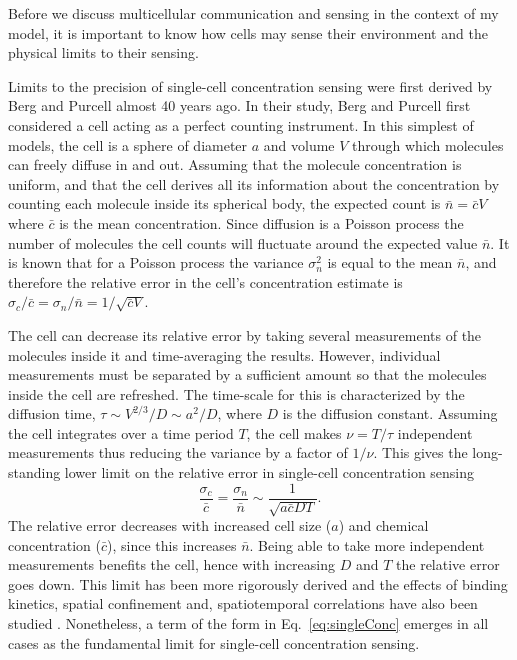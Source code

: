 \documentclass[a4paper]{article}
\begin{document}
Before we discuss multicellular communication and sensing in the context of my model, it is important to know how cells may sense their environment and the physical limits to their sensing.

Limits to the precision of single-cell concentration sensing were first derived by Berg and Purcell almost 40 years ago\cite{berg1977physics}. In their study, Berg and Purcell first considered a cell acting as a perfect counting instrument. In this simplest of models, the cell is a sphere of diameter $a$ and volume $V$ through which molecules can freely diffuse in and out. Assuming that the molecule concentration is uniform, and that the cell derives all its information about the concentration by counting each molecule inside its spherical body, the expected count is $\bar{n} = \bar{c}V$ where $\bar{c}$ is the mean concentration. Since diffusion is a Poisson process the number of molecules the cell counts will fluctuate around the expected value $\bar{n}$. It is known that for a Poisson process the variance $\sigma_n^2$ is equal to the mean $\bar{n}$, and therefore the relative error in the cell's concentration estimate is
$\sigma_c/\bar{c} = \sigma_n/\bar{n} = 1/\sqrt{\bar{c} V}$.

The cell can decrease its relative error by taking several measurements of the molecules inside it and time-averaging the results. However, individual measurements must be separated by a sufficient amount so that the molecules inside the cell are refreshed. The time-scale for this is characterized by the diffusion time, $\tau \sim V^{2/3}/D \sim a^2/D$, where $D$ is the diffusion constant. Assuming the cell integrates over a time period $T$, the cell makes $\nu = T/\tau$ independent measurements thus reducing the variance by a factor of $1/\nu$. This gives the long-standing lower limit on the relative error in single-cell concentration sensing
\begin{equation} \label{eq:singleConc}
\frac{ \sigma_c }{\bar{c}} = \frac{ \sigma_n}{\bar{n}} \sim \frac{1}{\sqrt{a\bar{c}DT}}.
\end{equation}
The relative error decreases with increased cell size ($a$) and chemical concentration ($\bar{c}$), since this increases $\bar{n}$. Being able to take more independent measurements benefits the cell, hence with increasing $D$ and $T$ the relative error goes down. This limit has been more rigorously derived \cite{berg1977physics} and the effects of binding kinetics, spatial confinement and, spatiotemporal correlations have also been studied \cite{bialek2005physical, kaizu2014berg, bicknell2015limits}. Nonetheless, a term of the form in Eq.\ \ref{eq:singleConc} emerges in all cases as the fundamental limit for single-cell concentration sensing.
\end{document}
